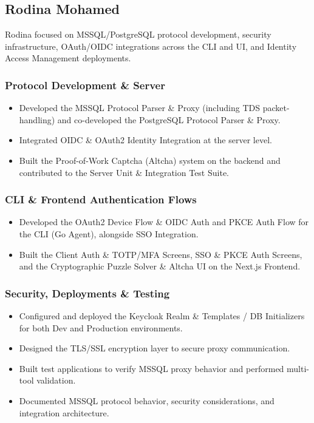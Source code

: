
\subsection{Rodina Mohamed}

Rodina focused on MSSQL/PostgreSQL protocol development, security infrastructure, OAuth/OIDC integrations across the CLI and UI, and Identity Access Management deployments.

\subsubsection{Protocol Development \& Server}
\begin{itemize}
    \item Developed the MSSQL Protocol Parser \& Proxy (including TDS packet-handling) and co-developed the PostgreSQL Protocol Parser \& Proxy.
    \item Integrated OIDC \& OAuth2 Identity Integration at the server level.
    \item Built the Proof-of-Work Captcha (Altcha) system on the backend and contributed to the Server Unit \& Integration Test Suite.
\end{itemize}

\subsubsection{CLI \& Frontend Authentication Flows}
\begin{itemize}
    \item Developed the OAuth2 Device Flow \& OIDC Auth and PKCE Auth Flow for the CLI (Go Agent), alongside SSO Integration.
    \item Built the Client Auth \& TOTP/MFA Screens, SSO \& PKCE Auth Screens, and the Cryptographic Puzzle Solver \& Altcha UI on the Next.js Frontend.
\end{itemize}

\subsubsection{Security, Deployments \& Testing}
\begin{itemize}
    \item Configured and deployed the Keycloak Realm \& Templates / DB Initializers for both Dev and Production environments.
    \item Designed the TLS/SSL encryption layer to secure proxy communication.
    \item Built test applications to verify MSSQL proxy behavior and performed multi-tool validation.
    \item Documented MSSQL protocol behavior, security considerations, and integration architecture.
\end{itemize}
